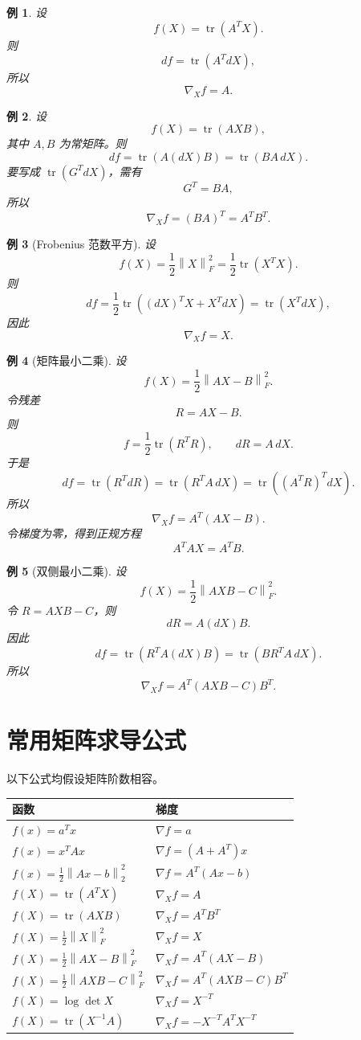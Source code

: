 \documentclass[UTF8,openany,zihao=-4]{ctexbook}
\theoremstyle{cnplain}
\newtheorem{example}{例}[chapter]
\newcommand{\tr}{\operatorname{tr}}
\newcommand{\norm}[1]{\left\lVert #1\right\rVert}
\begin{document}
\begin{example}
设
\[
f(X)=\tr(A^TX).
\]
则
\[
df=\tr(A^T dX),
\]
所以
\[
\nabla_X f=A.
\]
\end{example}

\begin{example}
设
\[
f(X)=\tr(AXB),
\]
其中 $A,B$ 为常矩阵。则
\[
df=\tr(A(dX)B)=\tr(BA\,dX).
\]
要写成 $\tr(G^T dX)$，需有
\[
G^T=BA,
\]
所以
\[
\nabla_X f=(BA)^T=A^TB^T.
\]
\end{example}

\begin{example}[Frobenius 范数平方]
设
\[
f(X)=\frac12\norm{X}_F^2=\frac12\tr(X^TX).
\]
则
\[
df=\frac12\tr((dX)^TX+X^TdX)
=\tr(X^TdX),
\]
因此
\[
\nabla_X f=X.
\]
\end{example}

\begin{example}[矩阵最小二乘]
设
\[
f(X)=\frac12\norm{AX-B}_F^2.
\]
令残差
\[
R=AX-B.
\]
则
\[
f=\frac12\tr(R^TR),
\qquad dR=A\,dX.
\]
于是
\[
df=\tr(R^T dR)=\tr(R^T A\,dX)=\tr((A^TR)^T dX).
\]
所以
\[
\nabla_X f=A^T(AX-B).
\]
令梯度为零，得到正规方程
\[
A^TAX=A^TB.
\]
\end{example}

\begin{example}[双侧最小二乘]
设
\[
f(X)=\frac12\norm{AXB-C}_F^2.
\]
令 $R=AXB-C$，则
\[
dR=A(dX)B.
\]
因此
\[
df=\tr(R^T A(dX)B)=\tr(BR^TA\,dX).
\]
所以
\[
\nabla_X f=A^T(AXB-C)B^T.
\]
\end{example}

\section{常用矩阵求导公式}

以下公式均假设矩阵阶数相容。

\begin{longtable}{>{\raggedright\arraybackslash}p{}>{\raggedright\arraybackslash}p{}}
\toprule
函数 & 梯度 \\
\midrule
$f(x)=a^Tx$ & $\nabla f=a$ \\
$f(x)=x^TAx$ & $\nabla f=(A+A^T)x$ \\
$f(x)=\frac12\norm{Ax-b}_2^2$ & $\nabla f=A^T(Ax-b)$ \\
$f(X)=\tr(A^TX)$ & $\nabla_X f=A$ \\
$f(X)=\tr(AXB)$ & $\nabla_X f=A^TB^T$ \\
$f(X)=\frac12\norm{X}_F^2$ & $\nabla_X f=X$ \\
$f(X)=\frac12\norm{AX-B}_F^2$ & $\nabla_X f=A^T(AX-B)$ \\
$f(X)=\frac12\norm{AXB-C}_F^2$ & $\nabla_X f=A^T(AXB-C)B^T$ \\
$f(X)=\log\det X$ & $\nabla_X f=X^{-T}$ \\
$f(X)=\tr(X^{-1}A)$ & $\nabla_X f=-X^{-T}A^TX^{-T}$ \\
\bottomrule
\end{longtable}
\end{document}
